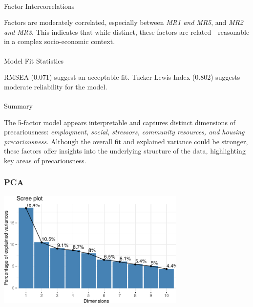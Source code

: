 \documentclass[
]{article}
\makeatletter
\let\oldparagraph\paragraph
\renewcommand{\paragraph}{
    \@ifstar
      \xxxParagraphStar
      \xxxParagraphNoStar
  }
\newcommand{\xxxParagraphStar}[1]{\oldparagraph*{#1}\mbox{}}
\newcommand{\xxxParagraphNoStar}[1]{\oldparagraph{#1}\mbox{}}
\makeatother
\begin{document}
\paragraph{Factor Intercorrelations}\label{factor-intercorrelations}

Factors are moderately correlated, especially between \emph{MR1 and
MR5}, and \emph{MR2 and MR3}. This indicates that while distinct, these
factors are related---reasonable in a complex socio-economic context.

\paragraph{Model Fit Statistics}\label{model-fit-statistics}

RMSEA (0.071) suggest an acceptable fit. Tucker Lewis Index (0.802)
suggests moderate reliability for the model.

\paragraph{Summary}\label{summary}

The 5-factor model appears interpretable and captures distinct
dimensions of precariousness: \emph{employment, social, stressors,
community resources, and housing precariousness}. Although the overall
fit and explained variance could be stronger, these factors offer
insights into the underlying structure of the data, highlighting key
areas of precariousness.

\subsubsection{PCA}\label{pca}

\begin{center}
\includegraphics[width=0.7\textwidth,height=\textheight]{draft_v3_files/figure-pdf/unnamed-chunk-15-1.pdf}
\end{center}
\end{document}
